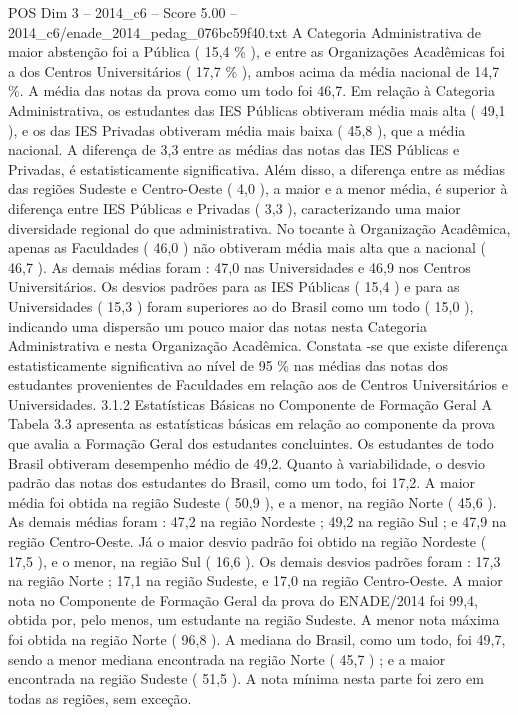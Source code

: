 \begin{textsample}{POS Dim 3 – 2014\_c6 – Score 5.00 – 2014\_c6/enade\_2014\_pedag\_076bc59f40.txt}
A Categoria Administrativa de maior abstenção foi a Pública ( 15,4 \% ), e entre as Organizações Acadêmicas foi a dos Centros Universitários ( 17,7 \% ), ambos acima da média nacional de 14,7 \%.
A média das notas da prova como um todo foi 46,7.
Em relação à Categoria Administrativa, os estudantes das IES Públicas obtiveram média mais alta ( 49,1 ), e os das IES Privadas obtiveram média mais baixa ( 45,8 ), que a média nacional.
A diferença de 3,3 entre as médias das notas das IES Públicas e Privadas, é estatisticamente significativa.
Além disso, a diferença entre as médias das regiões Sudeste e Centro-Oeste ( 4,0 ), a maior e a menor média, é superior à diferença entre IES Públicas e Privadas ( 3,3 ), caracterizando uma maior diversidade regional do que administrativa.
No tocante à Organização Acadêmica, apenas as Faculdades ( 46,0 ) não obtiveram média mais alta que a nacional ( 46,7 ).
As demais médias foram : 47,0 nas Universidades e 46,9 nos Centros Universitários.
Os desvios padrões para as IES Públicas ( 15,4 ) e para as Universidades ( 15,3 ) foram superiores ao do Brasil como um todo ( 15,0 ), indicando uma dispersão um pouco maior das notas nesta Categoria Administrativa e nesta Organização Acadêmica.
Constata -se que existe diferença estatisticamente significativa ao nível de 95 \% nas médias das notas dos estudantes provenientes de Faculdades em relação aos de Centros Universitários e Universidades. 3.1.2 Estatísticas Básicas no Componente de Formação Geral A Tabela 3.3 apresenta as estatísticas básicas em relação ao componente da prova que avalia a Formação Geral dos estudantes concluintes.
Os estudantes de todo Brasil obtiveram desempenho médio de 49,2.
Quanto à variabilidade, o desvio padrão das notas dos estudantes do Brasil, como um todo, foi 17,2.
A maior média foi obtida na região Sudeste ( 50,9 ), e a menor, na região Norte ( 45,6 ).
As demais médias foram : 47,2 na região Nordeste ; 49,2 na região Sul ; e 47,9 na região Centro-Oeste.
Já o maior desvio padrão foi obtido na região Nordeste ( 17,5 ), e o menor, na região Sul ( 16,6 ).
Os demais desvios padrões foram : 17,3 na região Norte ; 17,1 na região Sudeste, e 17,0 na região Centro-Oeste.
A maior nota no Componente de Formação Geral da prova do ENADE/2014 foi 99,4, obtida por, pelo menos, um estudante na região Sudeste.
A menor nota máxima foi obtida na região Norte ( 96,8 ).
A mediana do Brasil, como um todo, foi 49,7, sendo a menor mediana encontrada na região Norte ( 45,7 ) ; e a maior encontrada na região Sudeste ( 51,5 ).
A nota mínima nesta parte foi zero em todas as regiões, sem exceção.

\end{textsample}
